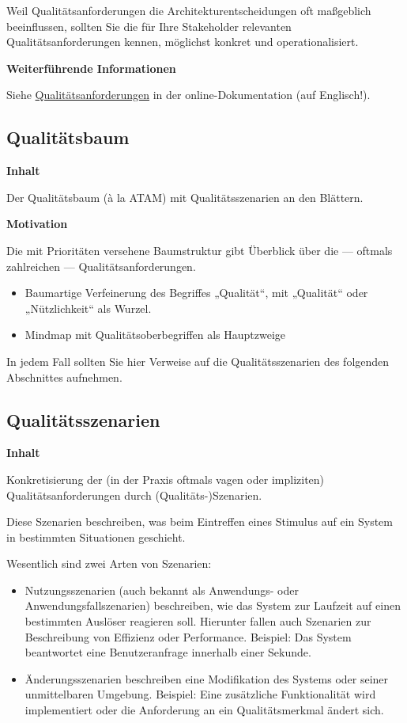 \documentclass[
]{article}
\begin{document}
Weil Qualitätsanforderungen die Architekturentscheidungen oft maßgeblich
beeinflussen, sollten Sie die für Ihre Stakeholder relevanten
Qualitätsanforderungen kennen, möglichst konkret und operationalisiert.

\textbf{Weiterführende Informationen}

Siehe \href{https://docs.arc42.org/section-10/}{Qualitätsanforderungen}
in der online-Dokumentation (auf Englisch!).

\hypertarget{_qualit_tsbaum}{%
\subsection{Qualitätsbaum}\label{_qualit_tsbaum}}

\textbf{Inhalt}

Der Qualitätsbaum (à la ATAM) mit Qualitätsszenarien an den Blättern.

\textbf{Motivation}

Die mit Prioritäten versehene Baumstruktur gibt Überblick über
die --- oftmals zahlreichen --- Qualitätsanforderungen.

\begin{itemize}
\item
  Baumartige Verfeinerung des Begriffes „Qualität``, mit „Qualität``
  oder „Nützlichkeit`` als Wurzel.
\item
  Mindmap mit Qualitätsoberbegriffen als Hauptzweige
\end{itemize}

In jedem Fall sollten Sie hier Verweise auf die Qualitätsszenarien des
folgenden Abschnittes aufnehmen.

\hypertarget{_qualit_tsszenarien}{%
\subsection{Qualitätsszenarien}\label{_qualit_tsszenarien}}

\textbf{Inhalt}

Konkretisierung der (in der Praxis oftmals vagen oder impliziten)
Qualitätsanforderungen durch (Qualitäts-)Szenarien.

Diese Szenarien beschreiben, was beim Eintreffen eines Stimulus auf ein
System in bestimmten Situationen geschieht.

Wesentlich sind zwei Arten von Szenarien:

\begin{itemize}
\item
  Nutzungsszenarien (auch bekannt als Anwendungs- oder
  Anwendungsfallszenarien) beschreiben, wie das System zur Laufzeit auf
  einen bestimmten Auslöser reagieren soll. Hierunter fallen auch
  Szenarien zur Beschreibung von Effizienz oder Performance. Beispiel:
  Das System beantwortet eine Benutzeranfrage innerhalb einer Sekunde.
\item
  Änderungsszenarien beschreiben eine Modifikation des Systems oder
  seiner unmittelbaren Umgebung. Beispiel: Eine zusätzliche
  Funktionalität wird implementiert oder die Anforderung an ein
  Qualitätsmerkmal ändert sich.
\end{itemize}
\end{document}
